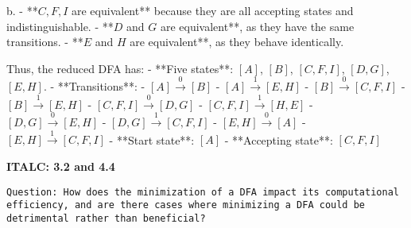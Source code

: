 \documentclass{article}
\theoremstyle{theorem}
\theoremstyle{definition}
\theoremstyle{remark}
\begin{document}
b. 
- **\( C, F, I \) are equivalent** because they are all accepting states and indistinguishable.  
- **\( D \) and \( G \) are equivalent**, as they have the same transitions.  
- **\( E \) and \( H \) are equivalent**, as they behave identically.  

Thus, the reduced DFA has:  
- **Five states**: \( [A] \), \( [B] \), \( [C, F, I] \), \( [D, G] \), \( [E, H] \).  
- **Transitions**:  
  - \( [A] \xrightarrow{0} [B] \)  
  - \( [A] \xrightarrow{1} [E, H] \)  
  - \( [B] \xrightarrow{0} [C, F, I] \)  
  - \( [B] \xrightarrow{1} [E, H] \)  
  - \( [C, F, I] \xrightarrow{0} [D, G] \)  
  - \( [C, F, I] \xrightarrow{1} [H, E] \)  
  - \( [D, G] \xrightarrow{0} [E, H] \)  
  - \( [D, G] \xrightarrow{1} [C, F, I] \)  
  - \( [E, H] \xrightarrow{0} [A] \)  
  - \( [E, H] \xrightarrow{1} [C, F, I] \)  
- **Start state**: \( [A] \)  
- **Accepting state**: \( [C, F, I] \)  

\textbf{ITALC: 3.2 and 4.4}
\begin{lstlisting}
Question: How does the minimization of a DFA impact its computational efficiency, and are there cases where minimizing a DFA could be detrimental rather than beneficial?
\end{lstlisting}
\end{document}
